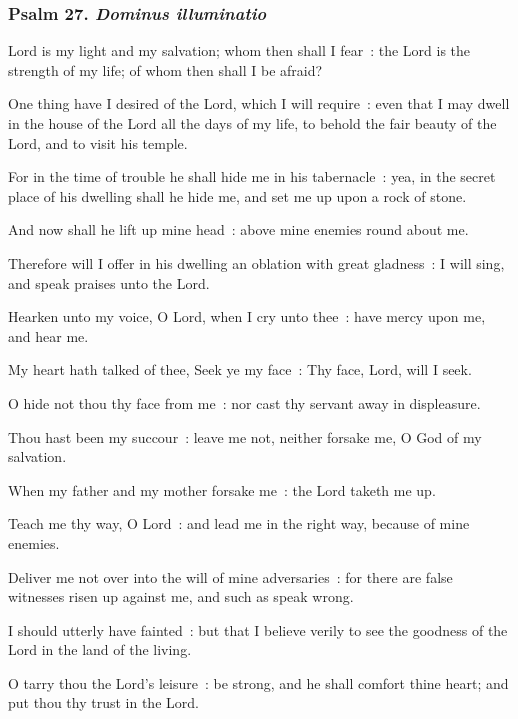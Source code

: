 \subsubsection{Psalm 27. \textit{Dominus illuminatio}}
 Lord is my light and my salvation; whom then shall I fear~: the Lord is the strength of my life; of whom then shall I be afraid?\par
{}
One thing have I desired of the Lord, which I will require~: even that I may dwell in the house of the Lord all the days of my life, to behold the fair beauty of the Lord, and to visit his temple.\par
{}For in the time of trouble he shall hide me in his tabernacle~: yea, in the secret place of his dwelling shall he hide me, and set me up upon a rock of stone.\par
{}And now shall he lift up mine head~: above mine enemies round about me.\par
{}Therefore will I offer in his dwelling an oblation with great gladness~: I will sing, and speak praises unto the Lord.\par
{}Hearken unto my voice, O Lord, when I cry unto thee~: have mercy upon me, and hear me.\par
{}My heart hath talked of thee, Seek ye my face~: Thy face, Lord, will I seek.\par
{}O hide not thou thy face from me~: nor cast thy servant away in displeasure.\par
{}Thou hast been my succour~: leave me not, neither forsake me, O God of my salvation.\par
{}When my father and my mother forsake me~: the Lord taketh me up.\par
{}Teach me thy way, O Lord~: and lead me in the right way, because of mine enemies.\par
{}Deliver me not over into the will of mine adversaries~: for there are false witnesses risen up against me, and such as speak wrong.\par
{}I should utterly have fainted~: but that I believe verily to see the goodness of the Lord in the land of the living.\par
{}O tarry thou the Lord's leisure~: be strong, and he shall comfort thine heart; and put thou thy trust in the Lord.\par

